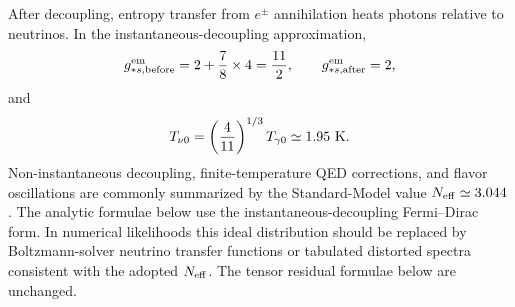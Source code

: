 \documentclass[
  aps,
  prd,
  reprint,
  superscriptaddress,
  nofootinbib,
  floatfix,
  longbibliography
]{revtex4-2}
\theoremstyle{plain}
\theoremstyle{definition}
\theoremstyle{remark}
\begin{document}
After decoupling, entropy transfer from $e^\pm$ annihilation heats photons
relative to neutrinos.  In the instantaneous-decoupling approximation,
\begin{equation}
g_{*s,{\rm before}}^{\rm em}=2+\frac{7}{8}\times 4=\frac{11}{2},\qquad
g_{*s,{\rm after}}^{\rm em}=2,
\end{equation}
and
\begin{equation}
T_{\nu0}=\left(\frac{4}{11}\right)^{1/3}T_{\gamma0}\simeq1.95\ {\rm K}.
\label{eq:Tnu0}
\end{equation}
Non-instantaneous decoupling, finite-temperature QED corrections, and flavor
oscillations are commonly summarized by the Standard-Model value
$N_{\rm eff}\simeq3.044$ \cite{Mangano2005,deSalasPastor2016,Froustey2020}.
The analytic formulae below use the instantaneous-decoupling Fermi--Dirac form.
In numerical likelihoods this ideal distribution should be replaced by
Boltzmann-solver neutrino transfer functions or tabulated distorted spectra
consistent with the adopted $N_{\rm eff}$.  The tensor residual formulae below
are unchanged.
\end{document}
